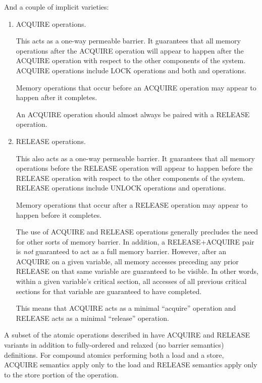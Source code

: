 And a couple of implicit varieties:

\begin{enumerate}
 \item
     ACQUIRE operations.

     This acts as a one-way permeable barrier.
     It guarantees that all memory operations after the ACQUIRE operation
     will appear to happen after the ACQUIRE operation with respect to the
     other components of the system.
     ACQUIRE operations include LOCK operations and both 
     and  operations.

     Memory operations that occur before an ACQUIRE operation may appear to
     happen after it completes.

     An ACQUIRE operation should almost always be paired with a RELEASE
     operation.


 \item
     RELEASE operations.

     This also acts as a one-way permeable barrier.
     It guarantees that all memory operations before the RELEASE operation
     will appear to happen before the RELEASE operation with respect to
     the other components of the system.
     RELEASE operations include UNLOCK operations and 
     operations.

     Memory operations that occur after a RELEASE operation may appear to
     happen before it completes.

     The use of ACQUIRE and RELEASE operations generally precludes the need
     for other sorts of memory barrier.
     In addition, a RELEASE+ACQUIRE pair is \emph{not} guaranteed to act
     as a full memory barrier.
     However, after an ACQUIRE on a given variable, all memory accesses
     preceding any prior RELEASE on that same variable are guaranteed to
     be visible.
     In other words, within a given variable's critical section, all
     accesses of all previous critical sections for that variable are
     guaranteed to have completed.

     This means that ACQUIRE acts as a minimal ``acquire'' operation and
     RELEASE acts as a minimal ``release'' operation.
\end{enumerate}

A subset of the atomic operations described in  have
ACQUIRE and RELEASE variants in addition to fully-ordered and relaxed
(no barrier semantics) definitions.
For compound atomics performing both a load and a store, ACQUIRE semantics
apply only to the load and RELEASE semantics apply only to the store portion
of the operation.

